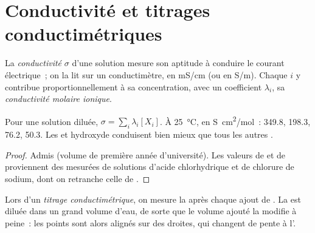 \section{Conductivité et titrages conductimétriques}

\begin{definition}\label{def:g12:ph-conductivity-titrations:conductivity}
La \emph{conductivité} $\sigma$ d'une solution
mesure son aptitude à conduire le courant électrique~; on la lit sur un
conductimètre, en \si{mS/cm} (ou en \si{S/m}). Chaque  $i$ y
contribue proportionnellement à sa concentration, avec un coefficient
$\lambda_i$, sa
\emph{conductivité molaire ionique}.
\end{definition}

\begin{proposition}\label{prop:g12:ph-conductivity-titrations:kohlrausch}
Pour une solution diluée, $\sigma = \sum_i \lambda_i [X_i]$. À
\qty{25}{\celsius}, en \si{S.cm^2/mol}~:  349.8, 
198.3,
 76.2,  50.3. Les  et hydroxyde conduisent
bien mieux que tous les autres .
\end{proposition}

\begin{proof}
Admis (volume de première année d'université). Les valeurs de 
et de  proviennent
des  mesurées de solutions d'acide chlorhydrique et de
chlorure de sodium, dont on retranche celle de .
\end{proof}

\begin{definition}\label{def:g12:ph-conductivity-titrations:conductimetric}
Lors d'un \emph{titrage conductimétrique},
on mesure la  après chaque ajout de . La
 est diluée dans un grand volume d'eau, de sorte que le
volume ajouté la modifie à peine~: les points sont alors alignés sur des
droites, qui changent de pente à l'.
\end{definition}

